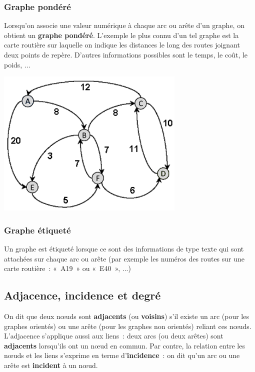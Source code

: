 		\subsubsection{Graphe pondéré}
			
			Lorsqu'on associe une valeur numérique à chaque arc ou 
			arête d'un graphe, on obtient un \textbf{graphe pondéré}.
			L'exemple le plus connu d'un tel graphe est la carte routière 
			sur laquelle on indique les distances le long des routes
			joignant deux points de repère. D'autres informations possibles 
			sont le temps, le coût, le poids, ...

			\begin{center}
			\includegraphics[width=9.038cm,height=7.091cm]{image/a2012Logique2eme-img045.png} 
			\end{center}
			
		\subsubsection{Graphe étiqueté}
		
			Un graphe est étiqueté lorsque ce sont des informations 
			de type texte qui sont attachées sur chaque arc ou arête (par
			exemple les numéros des routes sur une carte routière~: «~A19~» ou «~E40~», ...)


	\subsection{Adjacence, incidence et degré}
		
		On dit que deux n{\oe}uds sont \textbf{adjacents} 
		(ou \textbf{voisins}) s'il existe un arc (pour les graphes orientés)
		ou une arête (pour les graphes non orientés) reliant ces n{\oe}uds. 
		L'adjacence s'applique aussi aux liens~: deux arcs (ou deux arêtes) 
		sont \textbf{adjacents} lorsqu'ils ont un n{\oe}ud en commun. 
		Par contre, la relation entre les n{\oe}uds et les liens s'exprime 
		en terme d'\textbf{incidence}~: on dit qu'un arc ou une arête est 
		\textbf{incident} à un n{\oe}ud.

